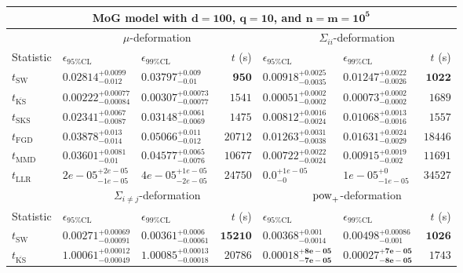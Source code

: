 \begin{tabular}{l|llr|llr}
	\toprule
	\multicolumn{7}{c}{{\bf MoG model with $\mathbf{d=100}$, $\mathbf{q=10}$, and $\mathbf{n=m=10^{5}}$}} \\
	\toprule
	\multicolumn{1}{c}{} & \multicolumn{3}{c}{$\mu$-deformation} & \multicolumn{3}{c}{$\Sigma_{ii}$-deformation} \\
	Statistic & $\epsilon_{95\%\mathrm{CL}}$ & $\epsilon_{99\%\mathrm{CL}}$ & $t$ (s) & $\epsilon_{95\%\mathrm{CL}}$ & $\epsilon_{99\%\mathrm{CL}}$ & $t$ (s) \\
	\midrule
	$t_{\mathrm{SW}}$ & $0.02814_{-0.012}^{+0.0099}$ & $0.03797_{-0.01}^{+0.009}$ & ${\mathbf{950}}$ & $0.00918_{-0.0035}^{+0.0025}$ & $0.01247_{-0.0026}^{+0.0022}$ & ${\mathbf{1022}}$ \\
	$t_{\overline{\mathrm{KS}}}$ & ${\mathbf{0.00222_{-0.00084}^{+0.00077}}}$ & ${\mathbf{0.00307_{-0.00077}^{+0.00073}}}$ & $1541$ & ${\mathbf{0.00051_{-0.0002}^{+0.0002}}}$ & ${\mathbf{0.00073_{-0.0002}^{+0.0002}}}$ & $1689$ \\
	$t_{\mathrm{SKS}}$ & $0.02341_{-0.0087}^{+0.0067}$ & $0.03148_{-0.0069}^{+0.0061}$ & $1475$ & $0.00812_{-0.0024}^{+0.0016}$ & $0.01068_{-0.0016}^{+0.0013}$ & $1557$ \\
	$t_{\mathrm{FGD}}$ & $0.03878_{-0.014}^{+0.013}$ & $0.05066_{-0.012}^{+0.011}$ & $20712$ & $0.01263_{-0.0038}^{+0.0031}$ & $0.01631_{-0.0029}^{+0.0024}$ & $18446$ \\
	$t_{\mathrm{MMD}}$ & $0.03601_{-0.01}^{+0.0081}$ & $0.04577_{-0.0076}^{+0.0065}$ & $10677$ & $0.00722_{-0.0024}^{+0.0022}$ & $0.00915_{-0.002}^{+0.0019}$ & $11691$ \\
	$t_{\mathrm{LLR}}$ & $2e-05_{-1e-05}^{+2e-05}$ & $4e-05_{-2e-05}^{+1e-05}$ & $24750$ & $0.0_{-0}^{+1e-05}$ & $1e-05_{-1e-05}^{+0}$ & $34527$ \\
	\toprule
	\multicolumn{1}{c}{} & \multicolumn{3}{c}{$\Sigma_{i\neq j}$-deformation} & \multicolumn{3}{c}{$\rm{pow}_{+}$-deformation} \\
	Statistic & $\epsilon_{95\%\mathrm{CL}}$ & $\epsilon_{99\%\mathrm{CL}}$ & $t$ (s) & $\epsilon_{95\%\mathrm{CL}}$ & $\epsilon_{99\%\mathrm{CL}}$ & $t$ (s) \\
	\midrule
	$t_{\mathrm{SW}}$ & $0.00271_{-0.00091}^{+0.00069}$ & $0.00361_{-0.00061}^{+0.0006}$ & ${\mathbf{15210}}$ & $0.00368_{-0.0014}^{+0.001}$ & $0.00498_{-0.001}^{+0.00086}$ & ${\mathbf{1026}}$ \\
	$t_{\overline{\mathrm{KS}}}$ & $1.00061_{-0.00049}^{+0.00012}$ & $1.00085_{-0.00018}^{+0.00013}$ & $20786$ & ${\mathbf{0.00018_{-7e-05}^{+8e-05}}}$ & ${\mathbf{0.00027_{-8e-05}^{+7e-05}}}$ & $1743$ \\

\end{tabular}
